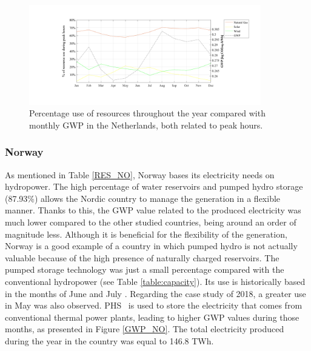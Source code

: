{\begin{figure}[]
	\centering
	\includegraphics[width=0.9\textwidth]{ChapterLCA/Images/GWP_plots/Comp_GWP_NL.png}
		\vspace*{-8mm}
	\caption{Percentage use of resources throughout the year compared with monthly GWP in the Netherlands, both related to peak hours.}
	
	\label{COMP_NL}
\end{figure}


 

\subsubsection{Norway}
As mentioned in Table \ref{RES_NO}, Norway bases its electricity needs on hydropower. The high percentage of water reservoirs and pumped hydro storage {(87.93\%)} allows the Nordic country to manage the generation in a flexible manner.  Thanks to this, the GWP value related to the produced electricity was much lower compared to the other studied countries, {being around an order of magnitude less}. Although it is beneficial for the flexibility of the generation, Norway is a good example of a country in which pumped hydro is not actually valuable because of the high presence of naturally charged reservoirs. The pumped storage technology was just a small percentage compared with the conventional hydropower (see Table \ref{table:capacity}). Its use is historically based in the months of June and July \cite{Kougias2017PumpedHorse}. Regarding the case study of 2018, a greater use in May was also observed. PHS%
~is used to store the electricity that comes from conventional thermal power plants, leading to higher GWP values during those months, as presented in Figure \ref{GWP_NO}. The total electricity produced during the year in the country was equal to 146.8 TWh.

}
